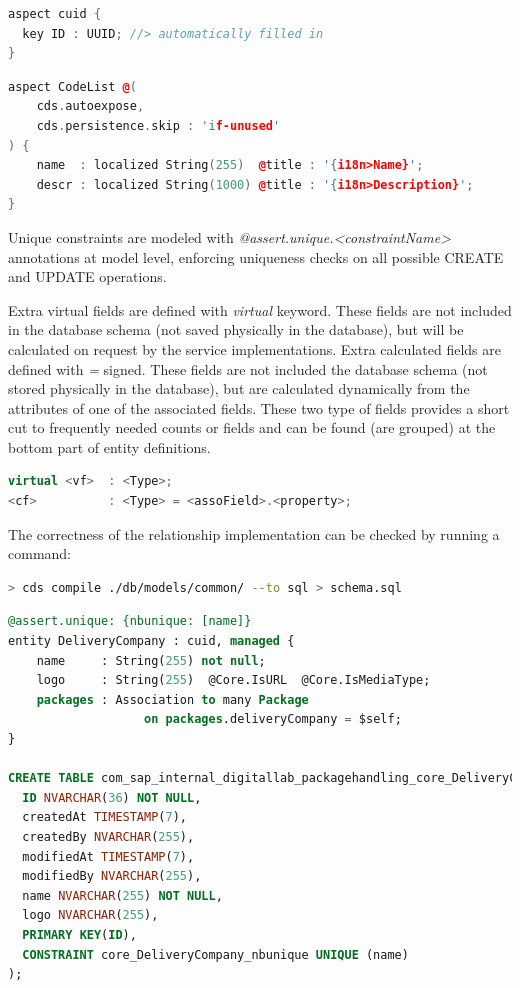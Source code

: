 \begin{lstlisting}[language={c++}]
aspect cuid {
  key ID : UUID; //> automatically filled in
}
\end{lstlisting}

\begin{lstlisting}[language={c++}]
aspect CodeList @(
    cds.autoexpose,
    cds.persistence.skip : 'if-unused'
) {
    name  : localized String(255)  @title : '{i18n>Name}';
    descr : localized String(1000) @title : '{i18n>Description}';
}
\end{lstlisting}

Unique constraints are modeled with \textit{@assert.unique.<constraintName>} annotations \cite{cap-cds-common-annotations} at model level, enforcing uniqueness checks on all possible CREATE and UPDATE operations.

Extra virtual fields are defined with \textit{virtual} keyword. These fields are not included in the database schema (not saved physically in the database), but will be calculated on request by the service implementations. 
Extra calculated fields are defined with \textit{=} signed. These fields are not included the database schema (not stored physically in the database), but are calculated dynamically from the attributes of one of the associated fields.
These two type of fields provides a short cut to frequently needed counts or fields and can be found (are grouped) at the bottom part of entity definitions.

\begin{lstlisting}[language={c++}]
virtual <vf>  : <Type>;
<cf>          : <Type> = <assoField>.<property>;
\end{lstlisting}


The correctness of the relationship implementation can be checked by running a command:

\begin{lstlisting}[language={bash}]
> cds compile ./db/models/common/ --to sql > schema.sql
\end{lstlisting}


\begin{lstlisting}[language={sql}]
@assert.unique: {nbunique: [name]}
entity DeliveryCompany : cuid, managed {
    name     : String(255) not null;
    logo     : String(255)  @Core.IsURL  @Core.IsMediaType;
    packages : Association to many Package
                   on packages.deliveryCompany = $self;
}

CREATE TABLE com_sap_internal_digitallab_packagehandling_core_DeliveryCompany (
  ID NVARCHAR(36) NOT NULL,
  createdAt TIMESTAMP(7),
  createdBy NVARCHAR(255),
  modifiedAt TIMESTAMP(7),
  modifiedBy NVARCHAR(255),
  name NVARCHAR(255) NOT NULL,
  logo NVARCHAR(255),
  PRIMARY KEY(ID),
  CONSTRAINT core_DeliveryCompany_nbunique UNIQUE (name)
); 
\end{lstlisting}

